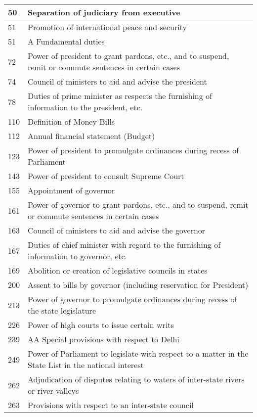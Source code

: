 \begin{multicol}{2}
{\begin{longtable}[c]{@{}|p{2cm}|p{10cm}|@{}}
  50 & Separation of judiciary from executive \\ \midrule
  51 & Promotion of international peace and security \\ \midrule
  51 & A Fundamental duties \\ \midrule
  72 & Power of president to grant pardons, etc., and to suspend, remit or commute sentences in certain cases \\ \midrule
  74 & Council of ministers to aid and advise the president \\
  78 & Duties of prime minister as respects the furnishing of information to the president, etc. \\ \midrule
  110 & Definition of Money Bills \\ \midrule
  112 & Annual financial statement (Budget) \\ \midrule
  123 & Power of president to promulgate ordinances during recess of Parliament \\ \midrule
  143 & Power of president to consult Supreme Court \\ \midrule
  155 & Appointment of governor \\ \midrule
  161 & Power of governor to grant pardons, etc., and to suspend, remit or commute sentences in certain cases \\ \midrule
  163 & Council of ministers to aid and advise the governor \\ \midrule
  167 & Duties of chief minister with regard to the furnishing of information to governor, etc. \\ \midrule
  169 & Abolition or creation of legislative councils in states \\ \midrule
  200 & Assent to bills by governor (including reservation for President) \\ \midrule
  213 & Power of governor to promulgate ordinances during recess of the state legislature \\ \midrule
  226 & Power of high courts to issue certain writs \\ \midrule
  239 & AA Special provisions with respect to Delhi \\ \midrule
  249 & Power of Parliament to legislate with respect  to a matter in the State List in the national interest \\ \midrule
  262 & Adjudication of disputes relating to waters of inter-state rivers or river valleys \\ \midrule
  263 & Provisions with respect to an inter-state council \\ \midrule

\end{longtable}}
\end{multicol}
